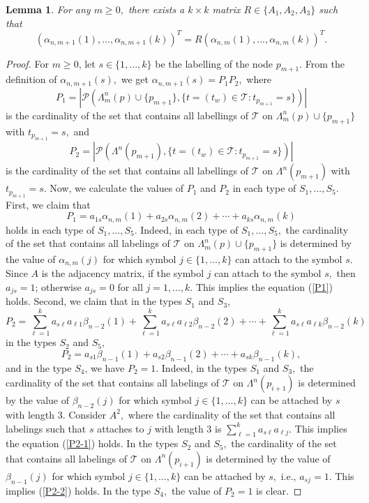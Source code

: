 \documentclass{amsart}
\newtheorem{lemma}[theorem]{Lemma}
\theoremstyle{definition}
\begin{document}
\begin{lemma}\label{lemma 1}
For any $m\geq 0,$ there exists a $k\times k$ matrix $R\in\{A_1,A_2,A_3\}$ such that 
\[(\alpha_{n,m+1}(1),...,\alpha_{n,m+1}(k))^T=R(\alpha_{n,m}(1),...,\alpha_{n,m}(k))^T.\]
\end{lemma}

\begin{proof}
For $m\geq 0$, let $s\in\{1,...,k\}$ be the labelling of the node $p_{m+1}.$ From the definition of $\alpha_{n,m+1}(s),$ we get $\alpha_{n,m+1}(s)=P_1P_2,$ where
\[P_1=\left|\mathcal{P}\left(\Lambda_m^n(p)\cup \{p_{m+1}\},\{t=(t_w)\in\mathcal{T}:t_{p_{m+1}}=s\}\right)\right|\]
is the cardinality of the set that contains all labellings of $\mathcal{T}$ on $\Lambda_m^n(p)\cup \{p_{m+1}\}$ with $t_{p_{m+1}}=s,$ and
\[P_2=\left|\mathcal{P}\left(\Lambda^n(p_{m+1}),\{t=(t_w)\in\mathcal{T}:t_{p_{m+1}}=s\}\right)\right|\]
is the cardinality of the set that contains all labellings of $\mathcal{T}$ on $\Lambda^n(p_{m+1})$ with $t_{p_{m+1}}=s.$ Now, we calculate the values of $P_1$ and $P_2$ in each type of $S_1,...,S_5.$  First, we claim that
\begin{equation}
    P_1=a_{1s}\alpha_{n,m}(1)+a_{2s}\alpha_{n,m}(2)+\cdots +a_{ks}\alpha_{n,m}(k)
\label{P1}
\end{equation}
holds in each type of $S_1,...,S_5.$ Indeed, in each type of $S_1,..., S_5,$ the cardinality of the set that contains all labelings of $\mathcal{T}$ on $\Lambda_m^n(p)\cup \{p_{m+1}\}$ is determined by the value of $\alpha_{n, m}(j)$ for which symbol $j\in\{1,...,k\}$ can attach to the symbol $s.$  Since $A$ is the adjacency matrix, if the symbol $j$ can attach to the symbol $s,$ then $a_{j s}=1$; otherwise $a_{j s}=0$ for all $j=1,...,k.$ This implies the equation (\ref{P1}) holds. Second, we claim that in the types $S_1$ and $S_3,$
\begin{equation}
    P_2=\sum_{\ell=1}^k a_{s\ell}a_{\ell 1}\beta_{n-2}(1)+\sum_{\ell=1}^k a_{s\ell}a_{\ell 2}\beta_{n-2}(2)+\cdots +\sum_{\ell=1}^k a_{s\ell}a_{\ell k}\beta_{n-2}(k)
\label{P2-1}
\end{equation}
in the types $S_2$ and $S_5,$
\begin{equation}
    P_2=a_{s1}\beta_{n-1}(1)+a_{s2}\beta_{n-1}(2)+\cdots +a_{sk}\beta_{n-1}(k),
\label{P2-2}
\end{equation}
and in the type $S_4$, we have $P_2=1$. Indeed, in the types $S_1$ and $S_3,$ the cardinality of the set that contains all labelings of $\mathcal{T}$ on $\Lambda^n(p_{i+1})$ is determined by the value of $\beta_{n-2}(j)$ for which symbol $j\in\{1,...,k\}$ can be attached by $s$ with length $3.$ Consider $A^2,$ where the cardinality of the set that contains all labelings such that $s$ attaches to $j$ with length $3$ is $\sum_{\ell=1}^k a_{s\ell}a_{\ell j}.$ This implies the equation (\ref{P2-1}) holds. In the types $S_2$ and $S_5,$ the cardinality of the set that contains all labelings of $\mathcal{T}$ on $\Lambda^n(p_{i+1})$ is determined by the value of $\beta_{n-1}(j)$ for which symbol $j\in\{1,...,k\}$ can be attached by $s,$ i.e., $a_{s j}=1.$ This implies (\ref{P2-2}) holds. In the type $S_4,$ the value of $P_2=1$ is clear.


\end{proof}
\end{document}
